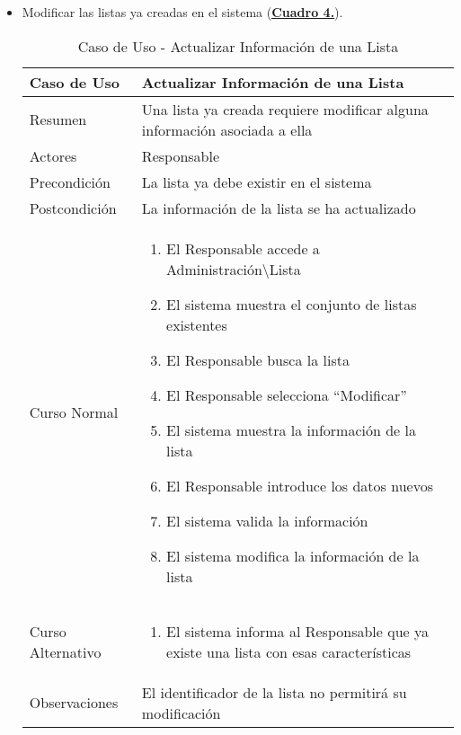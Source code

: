 \begin{itemize}
  \newpage~
	\item \addtocounter{tabla}{1} Modificar las listas ya creadas en el sistema (\textbf{\hyperref[tab:curActualizarLista]{Cuadro 4.}}).
		\begin{table}[!htbp]
		  \centering \addtocounter{casouso}{1}
		  \begin{tabular}{|l | p{100mm}|}
		    \textbf{Caso de Uso}  & \textbf{Actualizar Información de una Lista} \\ \hline
		    Resumen 		 & Una lista ya creada requiere modificar alguna información asociada a ella \\ \hline
		    Actores  		 & Responsable \\ \hline
		    Precondición  	 & La lista ya debe existir en el sistema  \\ \hline
		    Postcondición  	 & La información de la lista se ha actualizado \\ \hline
		    Curso Normal   	 & \begin{enumerate}
			  \item El Responsable accede a Administración\textbackslash Lista
			  \item El sistema muestra el conjunto de listas existentes
			  \item El Responsable busca la lista
			  \item El Responsable selecciona ``Modificar''
			  \item El sistema muestra la información de la lista
			  \item El Responsable introduce los datos nuevos
			  \item El sistema valida la información
			  \item El sistema modifica la información de la lista
		    \end{enumerate}  \\ \hline
		    Curso Alternativo  & \begin{enumerate}
			  \item El sistema informa al Responsable que ya existe una lista con esas características
		    \end{enumerate}  \\ \hline
		    Observaciones 	 & El identificador de la lista no permitirá su modificación  \\ \hline
		  \end{tabular}
		  \caption{Caso de Uso  - Actualizar Información de una Lista}
		  \label{tab:curActualizarLista}
		\end{table}
		\FloatBarrier
		

\end{itemize}
